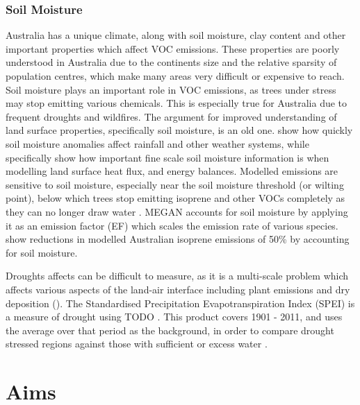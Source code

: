     \subsubsection{Soil Moisture}
      \label{LR:Models:Unc:SoilMoisture}
      Australia has a unique climate, along with soil moisture, clay content and other important properties which affect VOC emissions.
      These properties are poorly understood in Australia due to the continents size and the relative sparsity of population centres, which make many areas very difficult or expensive to reach.
      Soil moisture plays an important role in VOC emissions, as trees under stress may stop emitting various chemicals. 
      This is especially true for Australia due to frequent droughts and wildfires.
      The argument for improved understanding of land surface properties, specifically soil moisture, is an old one\citep{Mintz1982, Rowntree1983, Chen2001}. 
      \cite{Rowntree1983} show how quickly soil moisture anomalies affect rainfall and other weather systems, while \cite{Chen2001} specifically show how important fine scale soil moisture information is when modelling land surface heat flux, and energy balances.
      Modelled emissions are sensitive to soil moisture, especially near the soil moisture threshold (or wilting point), below which trees stop emitting isoprene and other VOCs completely as they can no longer draw water \citep{Bauwens2016}.
      MEGAN accounts for soil moisture by applying it as an emission factor (EF) which scales the emission rate of various species.
      \citet{Sindelarova2014} show reductions in modelled Australian isoprene emissions of 50\% by accounting for soil moisture. 
      
      Droughts affects can be difficult to measure, as it is a multi-scale problem which affects various aspects of the land-air interface including plant emissions and dry deposition (\cite{Wang2017}).
      The Standardised Precipitation Evapotranspiration Index (SPEI) is a measure of drought using TODO \cite{SPEI_website}.
      This product covers 1901 - 2011, and uses the average over that period as the background, in order to compare drought stressed regions against those with sufficient or excess water \cite{SPEI_website}.
      
\section{Aims}
  \label{LR:Aims}

